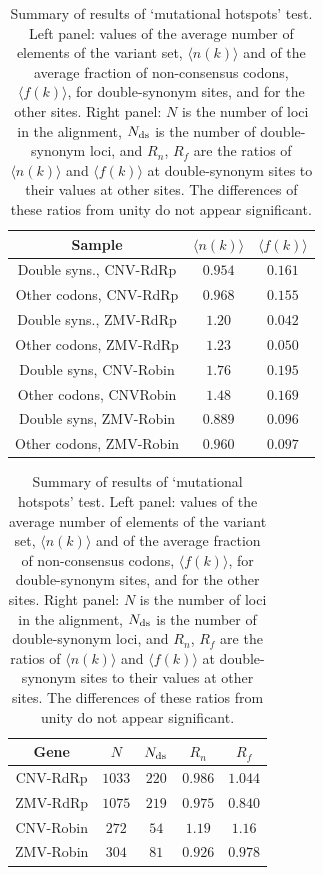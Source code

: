 \documentclass[unnumsec,webpdf,contemporary,large,namedate]{oup-authoring-template}%
\theoremstyle{thmstyleone}%
\theoremstyle{thmstyletwo}%
\theoremstyle{thmstylethree}%
\begin{document}
\begin{table}[h]
\begin{minipage}{0.5\textwidth}
\centering
\begin{tabular}{|c|c|c|}
\hline
Sample&$\langle n(k)\rangle$&$\langle f(k)\rangle$\\
\hline
Double syns., CNV-RdRp  &$0.954$&$0.161$\\
Other codons, CNV-RdRp  &$0.968$&$0.155$\\
Double syns., ZMV-RdRp  &$1.20$&$0.042$\\
Other codons, ZMV-RdRp  &$1.23$&$0.050$\\
Double syns, CNV-Robin &$1.76$&$0.195$\\
Other codons, CNVRobin &$1.48$&$0.169$\\
Double syns, ZMV-Robin   &$0.889$&$0.096$\\
Other codons, ZMV-Robin &$0.960$&$0.097$\\
\hline
\end{tabular}
\end{minipage}
\begin{minipage}{0.4\textwidth}
\centering
\begin{tabular}{|c|c|c|c|c|}
\hline
Gene&$N$&$N_{\rm ds}$&$R_n$&$R_f$\\
\hline
CNV-RdRp  &$1033$&$220$&$0.986$&$1.044$\\
ZMV-RdRp  &$1075$&$219$&$0.975$&$0.840$\\
CNV-Robin  &$272$&$54$&$1.19$&$1.16$\\
ZMV-Robin  &$304$&$81$&$0.926$&$0.978$\\
\hline
\end{tabular}
\end{minipage}
\caption{Summary of results of \lq mutational hotspots' test. Left panel: values of the average number
of elements of the variant set, $\langle n(k)\rangle$ and of the average fraction of non-consensus
codons, $\langle f(k)\rangle$, for double-synonym sites,  and for the other sites.
Right panel: $N$ is the number of loci in the alignment, $N_{\rm ds}$ is the
number of double-synonym loci, and $R_n$, $R_f$ are the ratios of $\langle n(k)\rangle $
and $\langle f(k)\rangle$ at double-synonym sites to their values at other sites.
The differences of these ratios from unity do not appear significant.
\label{tab: 5.4}}
\end{table}
\end{document}
